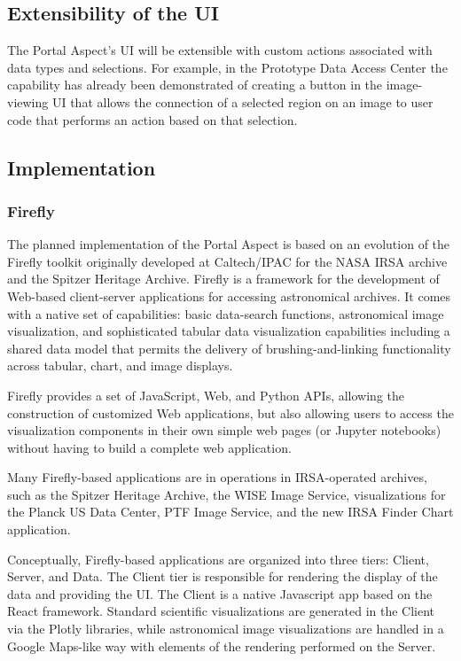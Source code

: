 \subsection{Extensibility of the UI}\label{extensibility-of-the-ui}

The Portal Aspect's UI will be extensible with custom actions associated with data types and selections.
For example, in the Prototype Data Access Center the capability has already been demonstrated of creating a button in the image-viewing UI that allows the connection of a selected region on an image to user code that performs an action based on that selection.

\subsection{Implementation}

\subsubsection{Firefly}

The planned implementation of the Portal Aspect is based on an evolution of the Firefly toolkit originally developed at Caltech/IPAC for the NASA IRSA archive and the Spitzer Heritage Archive.
Firefly is a framework for the development of Web-based client-server applications for accessing astronomical archives.
It comes with a native set of capabilities: basic data-search functions, astronomical image visualization, and sophisticated tabular data visualization capabilities including a shared data model that permits the delivery of brushing-and-linking functionality across tabular, chart, and image displays.

Firefly provides a set of JavaScript, Web, and Python APIs, allowing the construction of customized Web applications, but also allowing users to access the visualization components in their own simple web pages (or Jupyter notebooks) without having to build a complete web application.

Many Firefly-based applications are in operations in IRSA-operated archives, such as the Spitzer Heritage Archive, the WISE Image Service, visualizations for the Planck US Data Center, PTF Image Service, and the new IRSA Finder Chart application.

Conceptually, Firefly-based applications are organized into three tiers: Client, Server, and Data.
The Client tier is responsible for rendering the display of the data and providing the UI.
The Client is a native Javascript app based on the React framework.
Standard scientific visualizations are generated in the Client via the Plotly libraries, while astronomical image visualizations are handled in a Google Maps-like way with elements of the rendering performed on the Server.

